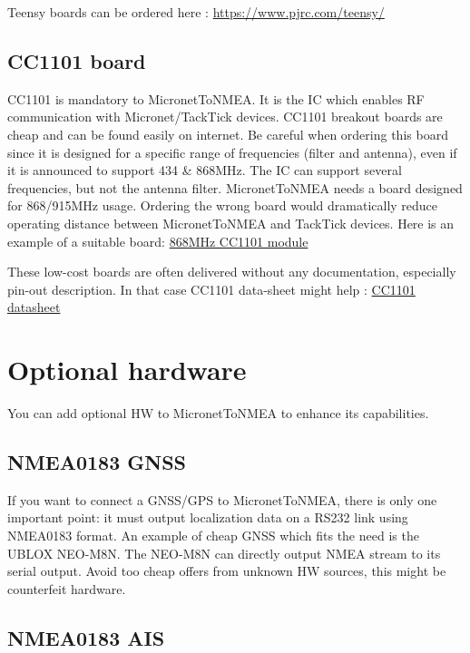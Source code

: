 \documentclass{report}
\begin{document}
Teensy boards can be ordered here : \url{https://www.pjrc.com/teensy/}

\subsection{CC1101 board}

CC1101 is mandatory to MicronetToNMEA. It is the IC which enables RF communication with Micronet/TackTick devices. CC1101 breakout boards are cheap and can be found easily on internet. Be careful when ordering this board since it is designed for a specific range of frequencies (filter and antenna), even if it is announced to support 434 \& 868MHz. The IC can support several frequencies, but not the antenna filter. MicronetToNMEA needs a board designed for 868/915MHz usage. Ordering the wrong board would dramatically reduce operating distance between MicronetToNMEA and TackTick devices. Here is an example of a suitable board: \href{https://www.amazon.fr/laqiya-cc1101-868-MHz-Transmission-Antenne-Transceiver/dp/B075PFQ57G}{868MHz CC1101 module}

These low-cost boards are often delivered without any documentation, especially pin-out description. In that case CC1101 data-sheet might help : \href{https://www.ti.com/lit/ds/symlink/cc1101.pdf}{CC1101 datasheet}

\section{Optional hardware}

You can add optional HW to MicronetToNMEA to enhance its capabilities.

\subsection{NMEA0183 GNSS}

If you want to connect a GNSS/GPS to MicronetToNMEA, there is only one important point: it must output localization data on a RS232 link using NMEA0183 format. An example of cheap GNSS which fits the need is the UBLOX NEO-M8N. The NEO-M8N can directly output NMEA stream to its serial output. Avoid too cheap offers from unknown HW sources, this might be counterfeit hardware.

\subsection{NMEA0183 AIS}
\end{document}
